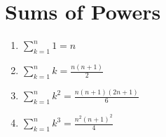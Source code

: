 \documentclass[letterpaper,12pt,fleqn]{article}
\begin{document}
\section*{Sums of Powers}

\begin{theorem}\mbox{}
\vspace*{-\parskip}
\vspace*{-\baselineskip}
\begin{enumerate}
\item $\sum_{k=1}^n1=n$
\item $\sum_{k=1}^nk=\frac{n(n+1)}{2}$
\item $\sum_{k=1}^nk^2=\frac{n(n+1)(2n+1)}{6}$
\item $\sum_{k=1}^nk^3=\frac{n^2(n+1)^2}{4}$
\end{enumerate}
\end{theorem}
\end{document}
